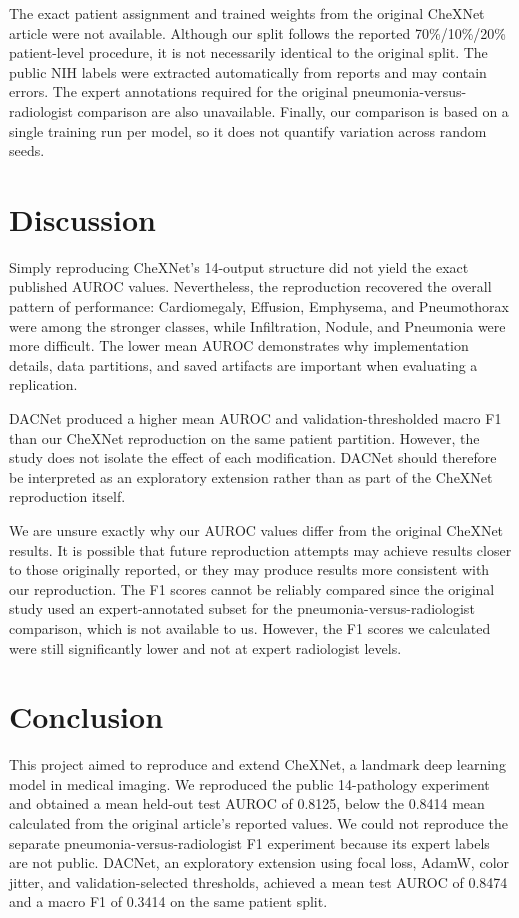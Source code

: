The exact patient assignment and trained weights from the original CheXNet
article were not available. Although our split follows the reported
70\%/10\%/20\% patient-level procedure, it is not necessarily identical to the
original split. The public NIH labels were extracted automatically from reports
and may contain errors. The expert annotations required for the original
pneumonia-versus-radiologist comparison are also unavailable. Finally, our
comparison is based on a single training run per model, so it does not quantify
variation across random seeds.


\section{Discussion}

Simply reproducing CheXNet's 14-output structure did not yield the exact
published AUROC values. Nevertheless, the reproduction recovered the overall
pattern of performance: Cardiomegaly, Effusion, Emphysema, and Pneumothorax
were among the stronger classes, while Infiltration, Nodule, and Pneumonia were
more difficult. The lower mean AUROC demonstrates why implementation details,
data partitions, and saved artifacts are important when evaluating a
replication.

DACNet produced a higher mean AUROC and validation-thresholded macro F1 than
our CheXNet reproduction on the same patient partition. However, the study does
not isolate the effect of each modification. DACNet should therefore be
interpreted as an exploratory extension rather than as part of the CheXNet
reproduction itself.

We are unsure exactly why our AUROC values differ from the original CheXNet results.
It is possible that future reproduction attempts may achieve results closer
to those originally reported, or they may produce results more consistent
with our reproduction. The F1 scores cannot be reliably compared since
the original study used an expert-annotated subset for the pneumonia-versus-radiologist comparison, 
which is not available to us. However, the F1 scores we calculated were still significantly lower
and not at expert radiologist levels.

\section{Conclusion}

This project aimed to reproduce and extend CheXNet, a landmark deep learning
model in medical imaging. We reproduced the public 14-pathology experiment and
obtained a mean held-out test AUROC of 0.8125, below the 0.8414 mean calculated
from the original article's reported values. We could not reproduce the
separate pneumonia-versus-radiologist F1 experiment because its expert labels
are not public. DACNet, an exploratory extension using focal loss, AdamW,
color jitter, and validation-selected thresholds, achieved a mean test AUROC
of 0.8474 and a macro F1 of 0.3414 on the same patient split.

